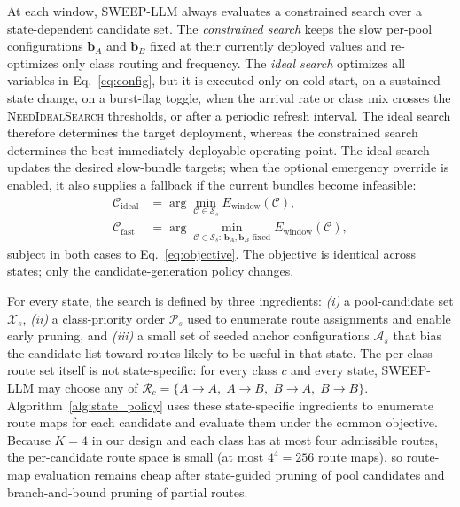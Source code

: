 At each window, SWEEP-LLM always evaluates a constrained search over a state-dependent candidate set.
The \emph{constrained search} keeps the slow per-pool configurations $\mathbf{b}_A$ and $\mathbf{b}_B$ fixed at their currently deployed values and re-optimizes only class routing and frequency.
The \emph{ideal search} optimizes all variables in Eq.~\ref{eq:config}, but it is executed only on cold start, on a sustained state change, on a burst-flag toggle, when the arrival rate or class mix crosses the \textsc{NeedIdealSearch} thresholds, or after a periodic refresh interval.
The ideal search therefore determines the target deployment, whereas the constrained search determines the best immediately deployable operating point.
The ideal search updates the desired slow-bundle targets; when the optional emergency override is enabled, it also supplies a fallback if the current bundles become infeasible:
\begin{align}
\mathcal{C}_{\mathrm{ideal}}
&=
\arg\min_{\mathcal{C}\in\mathcal{S}_s}
E_{\mathrm{window}}(\mathcal{C}),
\label{eq:ideal_search}
\\
\mathcal{C}_{\mathrm{fast}}
&=
\arg\min_{\mathcal{C}\in\mathcal{S}_s:\,\mathbf{b}_A,\mathbf{b}_B\text{ fixed}}
E_{\mathrm{window}}(\mathcal{C}),
\label{eq:constrained_search}
\end{align}
subject in both cases to Eq.~\ref{eq:objective}.
The objective is identical across states; only the candidate-generation policy changes.

For every state, the search is defined by three ingredients: \emph{(i)} a pool-candidate set $\mathcal{X}_s$, \emph{(ii)} a class-priority order $\mathcal{P}_s$ used to enumerate route assignments and enable early pruning, and \emph{(iii)} a small set of seeded anchor configurations $\mathcal{A}_s$ that bias the candidate list toward routes likely to be useful in that state.
The per-class route set itself is not state-specific: for every class $c$ and every state, SWEEP-LLM may choose any of $\mathcal{R}_c = \{A{\to}A,\;A{\to}B,\;B{\to}A,\;B{\to}B\}$.
Algorithm~\ref{alg:state_policy} uses these state-specific ingredients to enumerate route maps for each candidate and evaluate them under the common objective.
Because $K=4$ in our design and each class has at most four admissible routes, the per-candidate route space is small (at most $4^4=256$ route maps), so route-map evaluation remains cheap after state-guided pruning of pool candidates and branch-and-bound pruning of partial routes.

